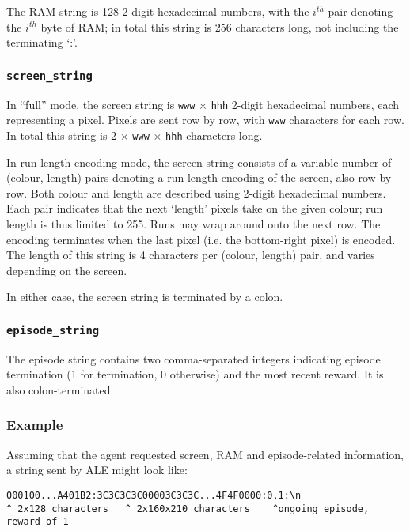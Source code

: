 \documentclass[12pt]{article}
\begin{document}
The RAM string is 128 2-digit hexadecimal numbers, with the $i^{th}$ pair denoting the
$i^{th}$ byte of RAM; in total this string is 256 characters long, not including the terminating
`:'.

\subsubsection{\texttt{screen\_string}}

In ``full'' mode, the screen string is \texttt{www} $\times$ \texttt{hhh} 2-digit hexadecimal numbers, each representing a pixel. Pixels are sent row by row, with \texttt{www} characters for each row. In total this string is 2 $\times$ \texttt{www} $\times$ \texttt{hhh} characters long.

In run-length encoding mode, the screen string consists of a variable number of (colour, length) pairs denoting a run-length encoding of the screen, also row by row. Both colour and length are described using 2-digit hexadecimal numbers. Each pair indicates that the next `length' pixels take on the given colour; run length is thus limited to 255. Runs may wrap around onto the next row. The encoding terminates when the last pixel (i.e. the bottom-right pixel) is encoded. The length of this string is 4 characters per (colour, length) pair, and varies depending on the screen.

In either case, the screen string is terminated by a colon.

\subsubsection{\texttt{episode\_string}}

The episode string contains two comma-separated integers indicating episode termination (1 for
termination, 0 otherwise) and the most recent reward. It is also colon-terminated.

\subsubsection{Example}

Assuming that the agent requested screen, RAM and episode-related information, a string sent by ALE might look like:

\begin{verbatim}
000100...A401B2:3C3C3C3C00003C3C3C...4F4F0000:0,1:\n
^ 2x128 characters   ^ 2x160x210 characters    ^ongoing episode, reward of 1
\end{verbatim}
\end{document}
